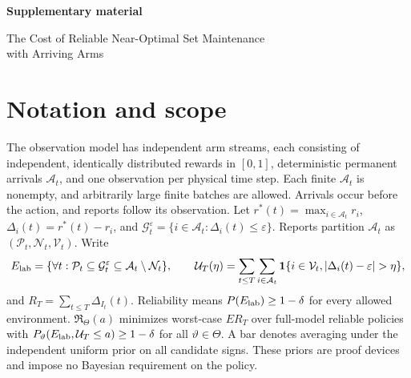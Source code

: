 \documentclass[11pt]{article}
\theoremstyle{remark}
\newcommand{\ind}{\mathbf 1}
\begin{document}
\FloatBarrier
\clearpage
\setcounter{section}{0}
\setcounter{equation}{0}
\setcounter{figure}{0}
\setcounter{table}{0}
\setcounter{algorithm}{0}
\setcounter{page}{1}
\renewcommand{\thesection}{S\arabic{section}}
\renewcommand{\theequation}{S\arabic{equation}}
\renewcommand{\thefigure}{S\arabic{figure}}
\renewcommand{\thetable}{S\arabic{table}}
\renewcommand{\thealgorithm}{S\arabic{algorithm}}
\renewcommand{\thepage}{S-\arabic{page}}
\renewcommand{\theHsection}{supp.\arabic{section}}
\renewcommand{\theHsubsection}{\theHsection.\arabic{subsection}}
\renewcommand{\theHsubsubsection}{\theHsubsection.\arabic{subsubsection}}
\renewcommand{\theHequation}{supp.\arabic{equation}}
\renewcommand{\theHfigure}{supp.\arabic{figure}}
\renewcommand{\theHtable}{supp.\arabic{table}}
\providecommand{\theHalgorithm}{}
\renewcommand{\theHalgorithm}{supp.\arabic{algorithm}}
\renewcommand{\theHtheorem}{\theHsection.\arabic{theorem}}
{}
\begin{center}
{\Large\bfseries Supplementary material\par}
\medskip
{\large The Cost of Reliable Near-Optimal Set Maintenance\\with Arriving Arms\par}
\end{center}
\medskip

\section*{Notation and scope}
The observation model has independent arm streams, each consisting of
independent, identically distributed rewards in $[0,1]$, deterministic
permanent arrivals $\mathcal A_t$, and one observation per physical time step.
Each finite $\mathcal A_t$ is nonempty, and arbitrarily large finite batches
are allowed. Arrivals occur before the action, and reports follow its
observation. Let $r^*(t)=\max_{i\in\mathcal A_t}r_i$,
$\Delta_i(t)=r^*(t)-r_i$, and
$\mathcal G_t^\varepsilon=\{i\in\mathcal A_t:\Delta_i(t)\le\varepsilon\}$.
Reports partition $\mathcal A_t$ as
$(\mathcal P_t,\mathcal N_t,\mathcal V_t)$. Write
\[
 E_{\rm lab}=\{\forall t:\mathcal P_t\subseteq\mathcal G_t^\varepsilon
                      \subseteq\mathcal A_t\setminus\mathcal N_t\},\qquad
 \mathcal U_T(\eta)=\sum_{t\le T}\sum_{i\in\mathcal A_t}
 \ind\{i\in\mathcal V_t,|\Delta_i(t)-\varepsilon|>\eta\},
\]
and $R_T=\sum_{t\le T}\Delta_{I_t}(t)$. Reliability means
$P(E_{\rm lab})\ge1-\delta$ for every allowed environment.
$\mathfrak R_\Theta(a)$ minimizes worst-case $ER_T$ over full-model reliable
policies with $P_\vartheta(E_{\rm lab},\mathcal U_T\le a)\ge1-\delta$ for all
$\vartheta\in\Theta$. A bar denotes averaging under the independent uniform
prior on all candidate signs. These priors are proof devices and impose no
Bayesian requirement on the policy.
\end{document}
